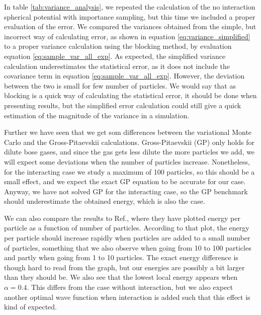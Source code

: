 \documentclass[norsk,a4paper,12pt]{article}
\begin{document}
In table \ref{tab:variance_analysis}, we repeated the calculation of the no interaction spherical potential with importance sampling, but this time we included a proper evaluation of the error. We compared the variances obtained from the simple, but incorrect way of calculating error, as shown in equation \ref{eq:variance_simplified} to a proper variance calculation using the blocking method, by evaluation equation \ref{eq:sample_var_all_exp}. As expected, the simplified variance calculation underestimates the statistical error, as it does not include the covariance term in equation \ref{eq:sample_var_all_exp}. However, the deviation between the two is small for few number of particles. We would say that as blocking is a quick way of calculating the statistical error, it should be done when presenting results, but the simplified error calculation could still give a quick estimation of the magnitude of the variance in a simulation.
\par 
\vspace{6mm}


Further we have seen that we get som differences between the variational Monte Carlo and the Gross-Pitaevskii calculations. Gross-Pitaevskii (GP) only holds for dilute bose gases, and since the gas gets less dilute the more particles we add, we will expect some deviations when the number of particles increase. Nonetheless, for the interacting case we study a maximum of 100 particles, so this should be a small effect, and we expect the exact GP equation to be accurate for our case. Anyway, we have not solved GP for the interacting case, so the GP benchmark should underestimate the obtained energy, which is also the case.

We can also compare the results to Ref.\cite{DuBois}, where they have plotted energy per particle as a function of number of particles. According to that plot, the energy per particle should increase rapidly when particles are added to a small number of particles, something that we also observe when going from 10 to 100 particles and partly when going from 1 to 10 particles. The exact energy difference is though hard to read from the graph, but our energies are possibly a bit larger than they should be. We also see that the lowest local energy appears when $\alpha=0.4$. This differs from the case without interaction, but we also expect another optimal wave function when interaction is added such that this effect is kind of expected. 
\par
\vspace{3mm}
\end{document}

